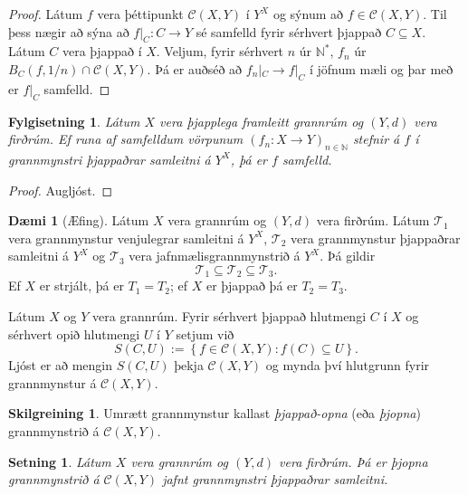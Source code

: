 \documentclass[a4paper,icelandic]{book}
\theoremstyle{definition}
\newtheorem{skilgr}{Skilgreining}[section]
\newtheorem{daemi}{Dæmi}[section]
\theoremstyle{plain}
\newtheorem{setn}{Setning}[section]
\newtheorem{fylgisetn}{Fylgisetning}[section]
\theoremstyle{remark}
\newcommand{\N}{\mathbb{N}} %
\begin{document}
\begin{proof}
  Látum $f$ vera þéttipunkt $\mathcal C(X,Y)$ í $Y^X$ og sýnum að
  $f\in\mathcal C(X,Y)$. Til þess nægir að sýna að $f|_C:C\to Y$ sé
  samfelld fyrir sérhvert þjappað $C\subseteq X$. Látum $C$ vera þjappað
  í $X$. Veljum, fyrir sérhvert $n$ úr $\N^*$, $f_n$ úr
  $B_C(f,1/n)\cap\mathcal C(X,Y)$. Þá er auðséð að
  $f_n|_C\longrightarrow f|_C$ í jöfnum mæli og þar með er $f|_C$
  samfelld.
\end{proof}
\begin{fylgisetn}
  Látum $X$ vera þjapplega framleitt grannrúm og $(Y,d)$ vera firðrúm.
  Ef runa af samfelldum vörpunum $(f_n:X\to Y)_{n\in\N}$ stefnir á $f$ í
  grannmynstri þjappaðrar samleitni á $Y^X$, þá er $f$ samfelld.
\end{fylgisetn}
\begin{proof}
  Augljóst.
\end{proof}
\begin{daemi}
  [Æfing]
  Látum $X$ vera grannrúm og $(Y,d)$ vera firðrúm. Látum $\mathcal T_1$
  vera grannmynstur venjulegrar samleitni á $Y^X$, $\mathcal T_2$ vera
  grannmynstur þjappaðrar samleitni á $Y^X$ og $\mathcal T_3$ vera
  jafnmælisgrannmynstrið á $Y^X$. Þá gildir\[
  \mathcal T_1\subseteq \mathcal T_2\subseteq \mathcal T_3.
  \]
  Ef $X$ er strjált, þá er $T_1 = T_2$; ef $X$ er þjappað þá er
  $T_2=T_3$. 
\end{daemi}
Látum $X$ og $Y$ vera grannrúm. Fyrir sérhvert þjappað hlutmengi $C$ í
$X$ og sérhvert opið hlutmengi $U$ í $Y$ setjum við\[
S(C,U) := \left\{ f\in\mathcal C(X,Y) : f(C)\subseteq U \right\}.
\]
Ljóst er að mengin $S(C,U)$ þekja $\mathcal C(X,Y)$ og mynda því
hlutgrunn fyrir grannmynstur á $\mathcal C(X,Y)$.
\begin{skilgr}
  Umrætt grannmynstur kallast
  \emph{þjappað-opna} (eða
  \emph{þjopna}) grannmynstrið á $\mathcal C(X,Y)$. 
\end{skilgr}
\begin{setn}
  Látum $X$ vera grannrúm og $(Y,d)$ vera firðrúm. Þá er þjopna
  grannmynstrið á $\mathcal C(X,Y)$ jafnt grannmynstri þjappaðrar
  samleitni.
\end{setn}
\end{document}
